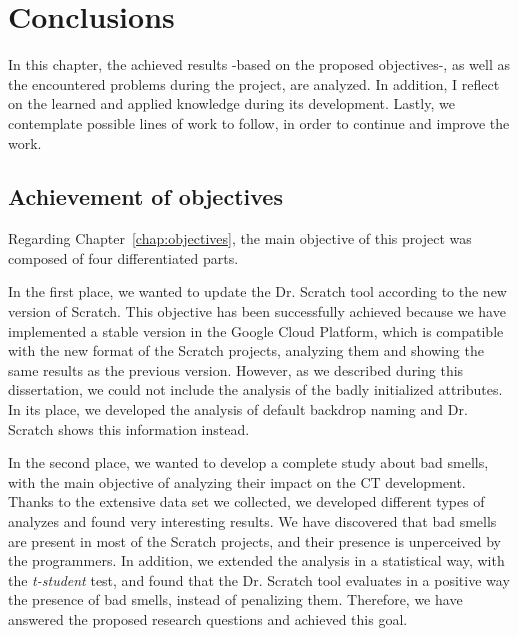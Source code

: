 

\cleardoublepage
\chapter{Conclusions}
\label{chap:conclusions}

In this chapter, the achieved results -based on the proposed objectives-, as well as the encountered problems during the project, are analyzed. In addition, I reflect on the learned and applied knowledge during its development. Lastly, we contemplate possible lines of work to follow, in order to continue and improve the work. 


\section{Achievement of objectives}
\label{sec:achievement_objectives}

Regarding Chapter~\ref{chap:objectives}, the main objective of this project was composed of four differentiated parts.

In the first place, we wanted to update the Dr. Scratch tool according to the new version of Scratch. This objective has been successfully achieved because we have implemented a stable version in the Google Cloud Platform, which is compatible with the new format of the Scratch projects, analyzing them and showing the same results as the previous version. However, as we described during this dissertation, we could not include the analysis of the badly initialized attributes. In its place, we developed the analysis of default backdrop naming and Dr. Scratch shows this information instead.

In the second place, we wanted to develop a complete study about bad smells, with the main objective of analyzing their impact on the CT development. Thanks to the extensive data set we collected, we developed different types of analyzes and found very interesting results. We have discovered that bad smells are present in most of the Scratch projects, and their presence is unperceived by the programmers. In addition, we extended the analysis in a statistical way, with the \textit{t-student} test, and found that the Dr. Scratch tool evaluates in a positive way the presence of bad smells, instead of penalizing them. Therefore, we have answered the proposed research questions and achieved this goal.

